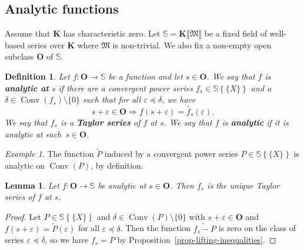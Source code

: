 \documentclass{article}
\newcommand{\of}{:}
\newcommand{\tmem}[1]{{\em #1\/}}
\newcommand{\tmop}[1]{\ensuremath{\operatorname{#1}}}
\newcommand{\tmstrong}[1]{\textbf{#1}}
\newtheorem{definition}[theorem]{Definition}
\newtheorem{lemma}[theorem]{Lemma}
\theoremstyle{remark}\newtheorem*{convention*}{Convention}
\newtheorem{example}[theorem]{Example}
\begin{document}
\subsection{Analytic functions}\label{subsection-analytic-functions}

Assume that $\mathbf{K}$ has characteristic zero. Let $\mathbb{S}= \mathbf{K}
\llbracket \mathfrak{M} \rrbracket$ be a fixed field of well-based series over
$\mathbf{K}$ where $\mathfrak{M}$ is non-trivial. We also fix a non-empty open
subclass $\mathbf{O}$ of $\mathbb{S}$.

\begin{definition}
  Let $f \of \mathbf{O} \longrightarrow \mathbb{S}$ be a function and let $s
  \in \mathbf{O}$. We say that $f$ is {\tmem{{\tmstrong{analytic
  at}}}}{} $s$ if there are a convergent power series $f_s
  \in \mathbb{S} \left\{ \!\! \{ X \} \!\! \right\}$ and a $\delta \in
  \tmop{Conv} (f_s) \setminus \{ 0 \}$ such that for all $\varepsilon
  \preccurlyeq \delta$, we have
  \[ s + \varepsilon \in \mathbf{O} \Longrightarrow f (s + \varepsilon) =
     \widetilde{f_s} (\varepsilon) . \]
  We say that $f_s$ is a {\tmem{{\tmstrong{Taylor series}}}}{} of $f$ at $s$. We say that $f$ is {\tmem{{\tmstrong{analytic}}}} if
  it is analytic at each~$s \in \mathbf{O}$.
\end{definition}

\begin{example}
  The function $\tilde{P}$ induced by a convergent power series $P \in
  \mathbb{S} \left\{ \!\! \{ X \} \!\! \right\}$ is analytic on $\tmop{Conv}
  (P)$, by definition.
\end{example}

\begin{lemma}
  Let $f \of \mathbf{O} \longrightarrow \mathbb{S}$ be analytic at $s \in
  \mathbf{O}$. Then $f_s$ is the unique Taylor series of $f$ at $s$.
\end{lemma}

\begin{proof}
  Let $P \in \mathbb{S} \left\{ \!\! \{ X \} \!\! \right\}$ and $\delta \in
  \tmop{Conv} (P) \setminus \{ 0 \}$ with $s + \varepsilon \in \mathbf{O}$ and
  $f (s + \varepsilon) = \tilde{P} (\varepsilon)$ for all $\varepsilon
  \preccurlyeq \delta$. Then the function $\widetilde{f_s - P}$ is zero on the
  class of series $\varepsilon \preccurlyeq \delta$, so we have $f_s = P$ by
  Proposition~\ref{prop-lifting-inequalities}.
\end{proof}
\end{document}
